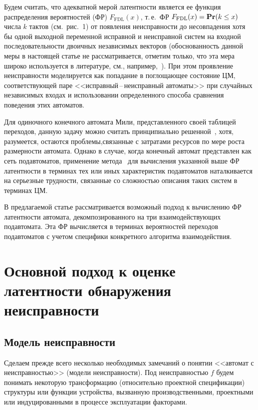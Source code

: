 \begin{multicols}{2}
 Будем считать, что адекватной мерой ла\-тент\-ности является ее функция
распределения вероятностей (ФР) $F_{\mathrm{FDL}}(x)$, т.\,е.\ ФР
$F_{\mathrm{FDL}}(x)={\bf Pr}(k\le x)$
числа $k$ тактов (см.\ рис.~1) от появления неисправности до
несовпадения хотя бы одной выходной переменной исправной и неисправной
систем на входной последовательности двоичных независимых векторов
(обоснованность данной меры в настоящей статье не рассматривается, отметим
только, что эта мера широко используется в литературе, см., например,~\cite{4, 7}).
При этом проявление неисправности моделируется как попадание в поглощающее
состояние ЦМ, соответствующей паре <<исправный\,--\,неисправный
автоматы>> при случайных независимых входах и использовании определенного
способа сравнения поведения этих автоматов.

 Для одиночного конечного автомата Мили, представленного своей таблицей
переходов, данную задачу можно считать принципиально решенной~\cite{4},
хотя, разумеется, остаются проблемы,\linebreak связанные с затратами ресурсов по мере
роста размерности автомата.
Однако в случае, когда конечный автомат представлен как сеть подавтоматов,
применение метода~\cite{4} для вычисления указанной выше ФР латентности в терминах
тех или иных характеристик подавтоматов наталкивается на серьез\-ные трудности,
связанные со сложностью описания таких систем в терминах ЦМ.

 В предлагаемой статье рассматривается возможный подход к вычислению ФР
латентности автомата, декомпозированного на три взаимо\-дей\-ст\-ву\-ющих подавтомата.
Эта ФР вычисляется в терминах вероятностей переходов подавтоматов с учетом
специфики конкретного алгоритма взаимодействия.

\section{Основной подход к оценке латентности обнаружения неисправности}

\subsection{Модель неисправности}

 Сделаем прежде всего несколько необходимых замечаний о понятии <<автомат с
неисправностью>> (модели неисправности).
Под неисправностью $f$ будем понимать некоторую трансформацию (относительно
проектной
спецификации) структуры или функции устройства, вызванную производственными,
проектными или индуцированными в процессе эксплуатации факторами.


\end{multicols}
